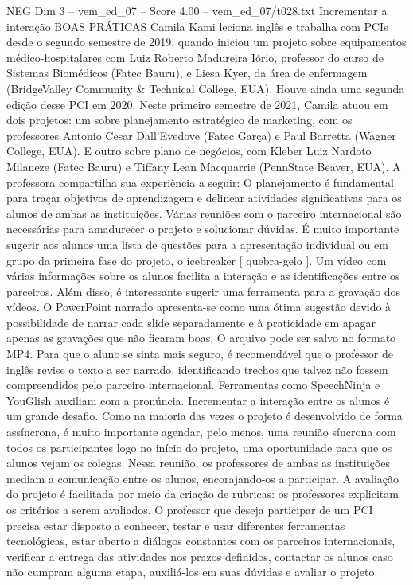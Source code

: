 \begin{textsample}{NEG Dim 3 – vem\_ed\_07 – Score 4.00 – vem\_ed\_07/t028.txt}  \label{ex:f3_neg_106}
Incrementar a interação BOAS PRÁTICAS Camila Kami leciona inglês e trabalha com PCIs desde o segundo semestre de 2019, quando iniciou um projeto sobre equipamentos médico-hospitalares com Luiz Roberto Madureira Iório, professor do curso de Sistemas Biomédicos (Fatec Bauru), e Liesa Kyer, da área de enfermagem (BridgeValley Community \& Technical College, EUA).
Houve ainda uma segunda edição desse PCI em 2020.
Neste primeiro semestre de 2021, Camila atuou em dois projetos: um sobre planejamento estratégico de marketing, com os professores Antonio Cesar Dall’Evedove (Fatec Garça) e Paul Barretta (Wagner College, EUA).
E outro sobre plano de negócios, com Kleber Luiz Nardoto Milaneze (Fatec Bauru) e Tiffany Lean Macquarrie (PennState Beaver, EUA).
A professora compartilha sua experiência a seguir: O planejamento é fundamental para traçar objetivos de aprendizagem e delinear atividades significativas para os alunos de ambas as instituições.
Várias reuniões com o parceiro internacional são necessárias para amadurecer o projeto e solucionar dúvidas.
É muito importante sugerir aos alunos uma lista de questões para a apresentação individual ou em grupo da primeira fase do projeto, o icebreaker [ quebra-gelo ].
Um vídeo com várias informações sobre os alunos facilita a interação e as identificações entre os parceiros.
Além disso, é interessante sugerir uma ferramenta para a gravação dos vídeos.
O PowerPoint narrado apresenta-se como uma ótima sugestão devido à possibilidade de narrar cada slide separadamente e à praticidade em apagar apenas as gravações que não ficaram boas.
O arquivo pode ser salvo no formato MP4.
Para que o aluno se sinta mais seguro, é recomendável que o professor de inglês revise o texto a ser narrado, identificando trechos que talvez não fossem compreendidos pelo parceiro internacional.
Ferramentas como SpeechNinja e YouGlish auxiliam com a pronúncia.
Incrementar a interação entre os alunos é um grande desafio.
Como na maioria das vezes o projeto é desenvolvido de forma assíncrona, é muito importante agendar, pelo menos, uma reunião síncrona com todos os participantes logo no início do projeto, uma oportunidade para que os alunos vejam os colegas.
Nessa reunião, os professores de ambas as instituições mediam a comunicação entre os alunos, encorajando-os a participar.
A avaliação do projeto é facilitada por meio da criação de rubricas: os professores explicitam os critérios a serem avaliados.
O professor que deseja participar de um PCI precisa estar disposto a conhecer, testar e usar diferentes ferramentas tecnológicas, estar aberto a diálogos constantes com os parceiros internacionais, verificar a entrega das atividades nos prazos definidos, contactar os alunos caso não cumpram alguma etapa, auxiliá-los em suas dúvidas e avaliar o projeto.

\end{textsample}

